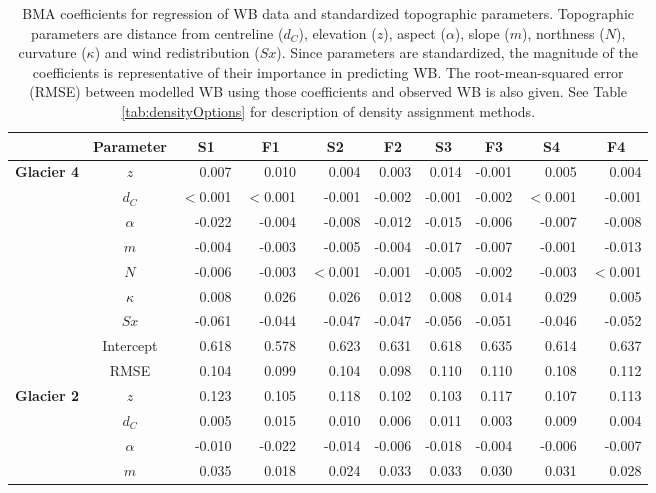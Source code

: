 \documentclass{sfuthesis}
\newcommand{\params}{Topographic parameters are distance from centreline ($d_C$), elevation ($z$), aspect ($\alpha$), slope ($m$), northness ($N$), curvature ($\kappa$) and wind redistribution ($Sx$). }
\begin{document}
\begin{table}
\footnotesize
\centering
\caption{BMA coefficients for regression of WB data and standardized topographic parameters. \params  Since parameters are standardized, the magnitude of the coefficients is representative of their importance in predicting WB. The root-mean-squared error (RMSE) between modelled WB using those coefficients and observed WB is also given. See Table \ref{tab:densityOptions} for description of density assignment methods.}
\label{tab:BMAcoeffFull}
\begin{tabular}{ccrrrrrrrr}
\textbf{} & \textbf{Parameter} & \multicolumn{1}{c}{\textbf{S1}} & \multicolumn{1}{c}{\textbf{F1}} & \multicolumn{1}{c}{\textbf{S2}} & \multicolumn{1}{c}{\textbf{F2}} & \multicolumn{1}{c}{\textbf{S3}} & \multicolumn{1}{c}{\textbf{F3}} & \multicolumn{1}{c}{\textbf{S4}} & \multicolumn{1}{c}{\textbf{F4}} \\ \hline \hline
\multirow{9}{*}{\textbf{Glacier 4}} & $z$ & 0.007 & 0.010 & 0.004 & 0.003 & 0.014 & -0.001 & 0.005 & 0.004 \\
 & $d_C$ & $<$0.001 & $<$0.001 & -0.001 & -0.002 & -0.001 & -0.002 & $<$0.001 & -0.001 \\
 & $\alpha$ & -0.022 & -0.004 & -0.008 & -0.012 & -0.015 & -0.006 & -0.007 & -0.008 \\
 & $m$ & -0.004 & -0.003 & -0.005 & -0.004 & -0.017 & -0.007 & -0.001 & -0.013 \\
 & $N$ & -0.006 & -0.003 & $<$0.001 & -0.001 & -0.005 & -0.002 & -0.003 & $<$0.001 \\
 & $\kappa$ & 0.008 & 0.026 & 0.026 & 0.012 & 0.008 & 0.014 & 0.029 & 0.005 \\
 & $Sx$ & -0.061 & -0.044 & -0.047 & -0.047 & -0.056 & -0.051 & -0.046 & -0.052 \\
 & Intercept & 0.618 & 0.578 & 0.623 & 0.631 & 0.618 & 0.635 & 0.614 & 0.637 \\
 & RMSE & 0.104 & 0.099 & 0.104 & 0.098 & 0.110 & 0.110 & 0.108 & 0.112 \\ \hline
\multirow{9}{*}{\textbf{Glacier 2}} & $z$ & 0.123 & 0.105 & 0.118 & 0.102 & 0.103 & 0.117 & 0.107 & 0.113 \\
 & $d_C$ & 0.005 & 0.015 & 0.010 & 0.006 & 0.011 & 0.003 & 0.009 & 0.004 \\
 & $\alpha$ & -0.010 & -0.022 & -0.014 & -0.006 & -0.018 & -0.004 & -0.006 & -0.007 \\
 & $m$ & 0.035 & 0.018 & 0.024 & 0.033 & 0.033 & 0.030 & 0.031 & 0.028 \\

\end{tabular}
\end{table}
\end{document}

